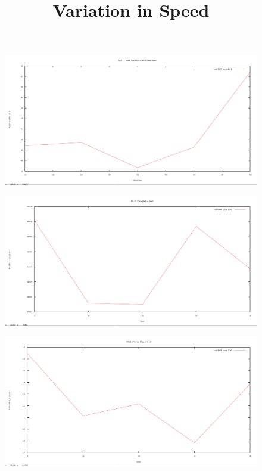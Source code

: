 \documentclass[12pt]{article}
\begin{document}
\begin{figure}[H]
	\centering
	\includegraphics[scale=	0.26]{image/802.11/Packetdropratio_vs_packetRates.png}
\end{figure}

\newpage
\title{Variation in Speed}
\begin{figure}[H]
	\centering
	\includegraphics[scale=	0.26]{image/802.11/Throughput_vs_speed.png}
\end{figure}

\begin{figure}[H]
	\centering
	\includegraphics[scale=	0.26]{image/802.11/Averagedelay_vs_speed.png}
\end{figure}
\end{document}
